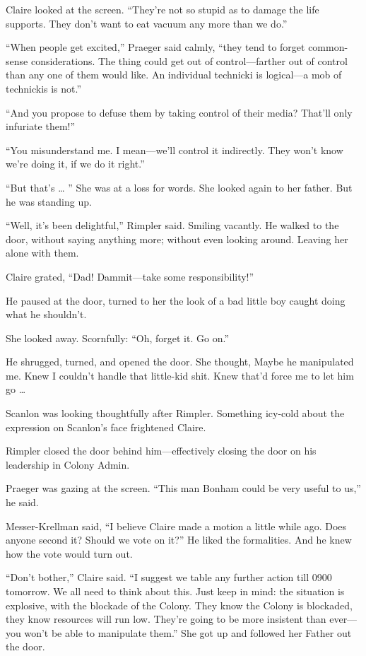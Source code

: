 Claire looked at the screen. “They’re not so stupid as to damage the life supports. They don’t want to eat vacuum any more than we do.”

“When people get excited,” Praeger said calmly, “they tend to forget common-sense considerations. The thing could get out of control—farther out of control than any one of them would like. An individual technicki is logical—a mob of technickis is not.”

“And you propose to defuse them by taking control of their media? That’ll only infuriate them!”

“You misunderstand me. I mean—we’ll control it indirectly. They won’t know we’re doing it, if we do it right.”

“But that’s … ” She was at a loss for words. She looked again to her father. But he was standing up.

“Well, it’s been delightful,” Rimpler said. Smiling vacantly. He walked to the door, without saying anything more; without even looking around. Leaving her alone with them.

Claire grated, “Dad! Dammit—take some responsibility!”

He paused at the door, turned to her the look of a bad little boy caught doing what he shouldn’t.

She looked away. Scornfully: “Oh, forget it. Go on.”

He shrugged, turned, and opened the door. She thought, Maybe he manipulated me. Knew I couldn’t handle that little-kid shit. Knew that’d force me to let him go …

Scanlon was looking thoughtfully after Rimpler. Something icy-cold about the expression on Scanlon’s face frightened Claire.

Rimpler closed the door behind him—effectively closing the door on his leadership in Colony Admin.

Praeger was gazing at the screen. “This man Bonham could be very useful to us,” he said.

Messer-Krellman said, “I believe Claire made a motion a little while ago. Does anyone second it? Should we vote on it?” He liked the formalities. And he knew how the vote would turn out.

“Don’t bother,” Claire said. “I suggest we table any further action till 0900 tomorrow. We all need to think about this. Just keep in mind: the situation is explosive, with the blockade of the Colony. They know the Colony is blockaded, they know resources will run low. They’re going to be more insistent than ever—you won’t be able to manipulate them.” She got up and followed her Father out the door.

